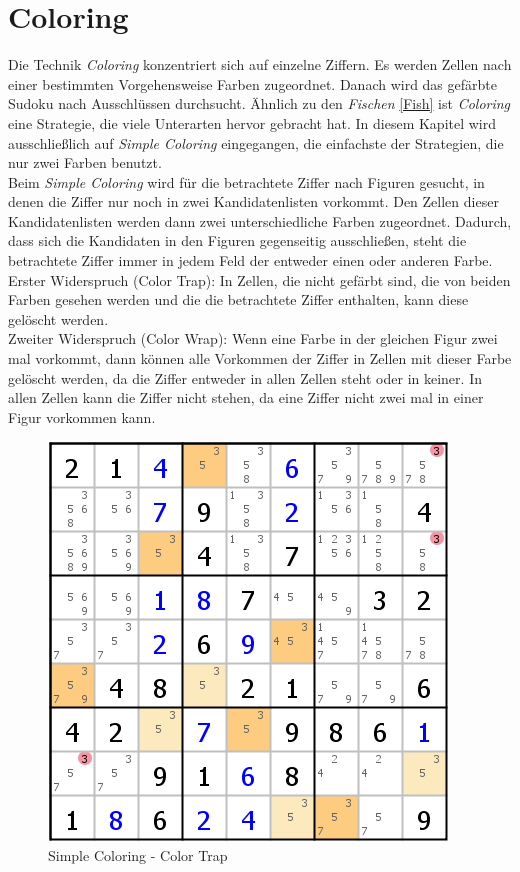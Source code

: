 \newpage
\section{Coloring}
\label{Coloring}
Die Technik \textit{Coloring} konzentriert sich auf einzelne Ziffern. Es werden Zellen nach einer bestimmten Vorgehensweise Farben zugeordnet. Danach wird das gefärbte Sudoku nach Ausschlüssen durchsucht. Ähnlich zu den \textit{Fischen} \ref{Fish} ist \textit{Coloring} eine Strategie, die viele Unterarten hervor gebracht hat. In diesem Kapitel wird ausschließlich auf \textit{Simple Coloring} eingegangen, die einfachste der Strategien, die nur zwei Farben benutzt.\\
Beim \textit{Simple Coloring} wird für die betrachtete Ziffer nach Figuren gesucht, in denen die Ziffer nur noch in zwei Kandidatenlisten vorkommt. Den Zellen dieser Kandidatenlisten werden dann zwei unterschiedliche Farben zugeordnet. Dadurch, dass sich die Kandidaten in den Figuren gegenseitig ausschließen, steht die betrachtete Ziffer immer in jedem Feld der entweder einen oder anderen Farbe.\\ 
Erster Widerspruch (Color Trap): In Zellen, die nicht gefärbt sind, die von beiden Farben gesehen werden und die die betrachtete Ziffer enthalten, kann diese gelöscht werden.\\
Zweiter Widerspruch (Color Wrap): Wenn eine Farbe in der gleichen Figur zwei mal vorkommt, dann können alle Vorkommen der Ziffer in Zellen mit dieser Farbe gelöscht werden, da die Ziffer entweder in allen Zellen steht oder in keiner. In allen Zellen kann die Ziffer nicht stehen, da eine Ziffer nicht zwei mal in einer Figur vorkommen kann.

\begin{figure}[h]
\begin{center}
\includegraphics{./img/simple_coloring.png}
\caption{Simple Coloring - Color Trap}
\end{center}
\end{figure}

